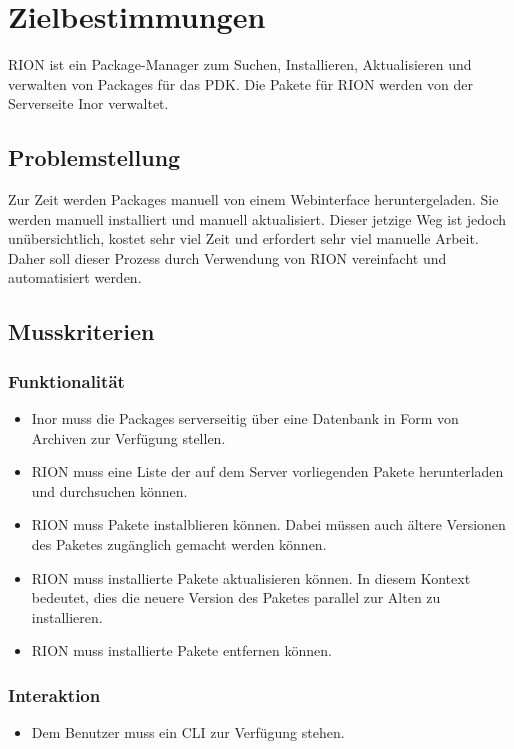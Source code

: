 \chapter{Zielbestimmungen}

RION ist ein Package-Manager zum Suchen, Installieren, Aktualisieren und verwalten von Packages für das PDK. Die Pakete für RION werden von der Serverseite Inor verwaltet.

\section{Problemstellung}
Zur Zeit werden Packages manuell von einem Webinterface heruntergeladen. Sie werden manuell installiert und manuell aktualisiert. Dieser jetzige Weg ist jedoch unübersichtlich, kostet sehr viel Zeit und erfordert sehr viel manuelle Arbeit. Daher soll dieser Prozess durch Verwendung von RION vereinfacht und automatisiert werden.

\section{Musskriterien}
\subsection{Funktionalität}
\begin{itemize}
		\item Inor muss die Packages serverseitig über eine Datenbank in Form von Archiven zur Verfügung stellen.
		\item RION muss eine Liste der auf dem Server vorliegenden Pakete herunterladen und durchsuchen können.
		\item RION muss Pakete instalblieren können. Dabei müssen auch ältere Versionen des Paketes zugänglich gemacht werden können.
		\item RION muss installierte Pakete aktualisieren können. In diesem Kontext bedeutet, dies die neuere Version des Paketes parallel zur Alten zu installieren.
		\item RION muss installierte Pakete entfernen können.
\end{itemize}

\subsection{Interaktion}


\begin{itemize}
	\item Dem Benutzer muss ein CLI zur Verfügung stehen.
\end{itemize}

